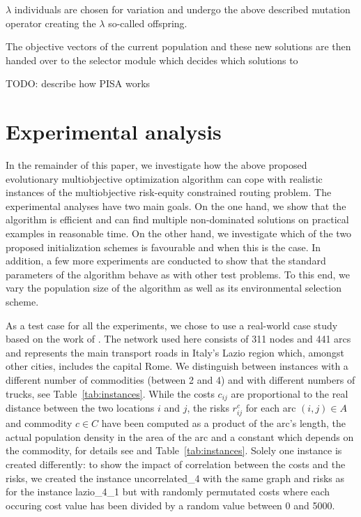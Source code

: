 \documentclass[preprint,12pt]{elsarticle}
\newcommand{\TODO}[1]{{\color{red}TODO: #1}}
\begin{document}
$\lambda$ individuals are chosen for variation and undergo the above described mutation operator creating the $\lambda$ so-called offspring.

 The objective vectors of the current population and these new solutions are then handed over to the selector module which decides which solutions to 

\TODO{describe how PISA works}


\section{Experimental analysis}
In the remainder of this paper, we investigate how the above proposed evolutionary multiobjective optimization algorithm can cope with realistic instances of the multiobjective risk-equity constrained routing problem. The experimental analyses have two main goals. On the one hand, we show that the algorithm is efficient and can find multiple non-dominated solutions on practical examples in reasonable time. On the other hand, we investigate which of the two proposed initialization schemes is favourable and when this is the case. In addition, a few more experiments are conducted to show that the standard parameters of the algorithm behave as with other test problems. To this end, we vary the population size of the algorithm as well as its environmental selection scheme.

As a test case for all the experiments, we chose to use a real-world case study based on the work of \citet{bcg2009a}. The network used here consists of 311 nodes and 441 arcs and represents the main transport roads in Italy's Lazio region which, amongst other cities, includes the capital Rome. We distinguish between instances with a different number of commodities (between 2 and 4) and with different numbers of trucks, see Table~\ref{tab:instances}. While the costs $c_{ij}$ are proportional to the real distance between the two locations $i$ and $j$, the risks $r_{ij}^c$ for each arc $(i,j) \in A$ and commodity $c \in C$ have been computed as a product of the arc's length, the actual population density in the area of the arc and a constant which depends on the commodity, for details see \citep{bcg2009a} and Table~\ref{tab:instances}. Solely one instance is created differently: to show the impact of correlation between the costs and the risks, we created the instance uncorrelated\_4 with the same graph and risks as for the instance lazio\_4\_1 but with randomly permutated costs where each occuring cost value has been divided by a random value between 0 and 5000.
\end{document}
